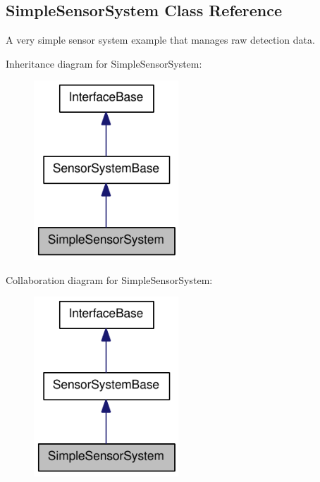 \hypertarget{classOpenRAVE_1_1SimpleSensorSystem}{
\subsection{SimpleSensorSystem Class Reference}
\label{classOpenRAVE_1_1SimpleSensorSystem}
}


A very simple sensor system example that manages raw detection data.  




Inheritance diagram for SimpleSensorSystem:\nopagebreak
\begin{figure}[H]
\begin{center}
\leavevmode
\includegraphics[width=154pt]{classOpenRAVE_1_1SimpleSensorSystem__inherit__graph}
\end{center}
\end{figure}


Collaboration diagram for SimpleSensorSystem:\nopagebreak
\begin{figure}[H]
\begin{center}
\leavevmode
\includegraphics[width=154pt]{classOpenRAVE_1_1SimpleSensorSystem__coll__graph}
\end{center}
\end{figure}
